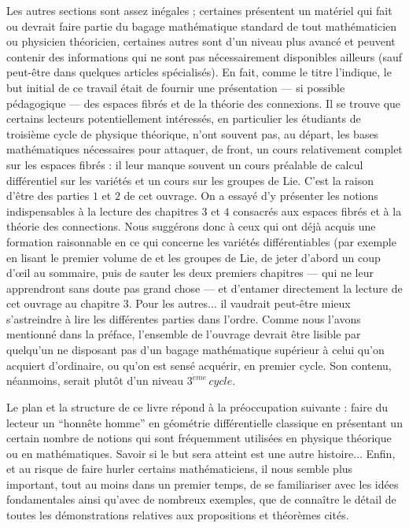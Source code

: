 \bigskip
Les autres sections sont assez in\'egales ; certaines pr\'esentent un mat\'eriel 
qui fait ou devrait faire partie du
bagage math\'ematique standard de tout math\'ematicien ou physicien th\'eoricien,
certaines autres sont d'un niveau plus avanc\'e et peuvent contenir des 
informations qui ne sont pas n\'ecessairement disponibles ailleurs (sauf 
peut-\^etre dans quelques articles sp\'ecialis\'es).
En fait, comme le titre l'indique, le but initial de ce travail \'etait de
fournir une pr\'esentation  --- si possible p\'edagogique --- des espaces
fibr\'es et de la th\'eorie des connexions. Il se trouve que certains lecteurs
potentiellement int\'eress\'es, en particulier les \'etudiants de
troisi\`eme cycle de physique th\'eorique, n'ont souvent pas, au d\'epart, les 
bases math\'ematiques n\'ecessaires pour attaquer, de front, un cours 
relativement complet sur les espaces fibr\'es : il leur manque souvent un
cours pr\'ealable de calcul diff\'erentiel sur les vari\'et\'es et un cours sur
les groupes de Lie. C'est la raison d'\^etre des parties $1$ et $2$ de cet
ouvrage. On a essay\'e d'y pr\'esenter les notions indispensables \`a la
lecture des chapitres $3$ et $4$ consacr\'es aux espaces fibr\'es et 
\`a la th\'eorie des connections. Nous sugg\'erons donc \`a ceux qui ont d\'ej\`a
acquis une formation raisonnable en ce qui concerne les vari\'et\'es 
diff\'erentiables (par exemple en lisant
le premier volume de \cite{Spivak}
et les groupes de Lie, de jeter d'abord un coup d'\oe{il} au
sommaire, puis de sauter les deux premiers chapitres --- qui
ne leur apprendront sans doute pas grand chose --- et 
d'entamer directement la lecture de cet ouvrage au chapitre $3$.
Pour les autres$\ldots$ il vaudrait peut-\^etre mieux 
s'astreindre \`a lire les diff\'erentes parties dans l'ordre.
Comme nous l'avons mentionn\'e dans la pr\'eface,
l'ensemble de l'ouvrage devrait
\^etre lisible par  quelqu'un ne disposant pas d'un bagage math\'ematique
sup\'erieur \`a celui qu'on acquiert d'ordinaire, ou qu'on est sens\'e acqu\'erir,  en premier cycle.
Son contenu, n\'eanmoins, serait plut\^ot d'un niveau $3^{\grave{e}me} 
\, cycle$. 

Le plan et la structure de ce livre r\'epond \`a la pr\'eoccupation suivante : 
faire du lecteur un ``honn\^ete homme'' en g\'eom\'etrie diff\'erentielle 
classique en pr\'esentant un certain nombre de notions qui sont 
fr\'equemment utilis\'ees en physique th\'eorique ou en math\'ematiques. Savoir si le but sera atteint est une 
autre histoire$\ldots$ Enfin, et au risque de faire hurler certains
math\'ematiciens, il nous semble plus important, tout au moins dans un premier temps, de se familiariser avec les 
id\'ees fondamentales ainsi qu'avec de nombreux exemples, que de conna\^itre
le d\'etail de toutes les d\'emonstrations relatives aux propositions et 
th\'eor\`emes cit\'es. 



